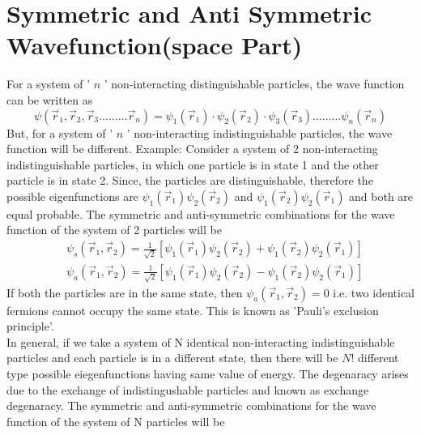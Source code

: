 \section{Symmetric and Anti Symmetric Wavefunction(space Part)}
For a system of ' $n$ ' non-interacting distinguishable particles, the wave function can be written as
$$
\psi\left(\vec{r}_{1}, \vec{r}_{2}, \vec{r}_{3} \ldots \ldots \ldots \vec{r}_{n}\right)=\psi_{1}\left(\vec{r}_{1}\right) \cdot \psi_{2}\left(\vec{r}_{2}\right) \cdot \psi_{3}\left(\vec{r}_{3}\right) \ldots \ldots \ldots \psi_{n}\left(\vec{r}_{n}\right)
$$
But, for a system of ' $n$ ' non-interacting indistinguishable particles, the wave function will be different.
Example:
Consider a system of 2 non-interacting indistinguishable particles, in which one particle is in state 1 and the other particle is in state 2. Since, the particles are distinguishable, therefore the possible eigenfunctions are $\psi_{1}\left(\vec{r}_{1}\right) \psi_{2}\left(\vec{r}_{2}\right)$ and $\psi_{1}\left(\vec{r}_{2}\right) \psi_{2}\left(\vec{r}_{1}\right)$ and both are equal probable. The symmetric and anti-symmetric combinations for the wave function of the system of 2 particles will be
$$
\begin{aligned}
&\psi_{s}\left(\vec{r}_{1}, \vec{r}_{2}\right)=\frac{1}{\sqrt{2}}\left[\psi_{1}\left(\vec{r}_{1}\right) \psi_{2}\left(\vec{r}_{2}\right)+\psi_{1}\left(\vec{r}_{2}\right) \psi_{2}\left(\vec{r}_{1}\right)\right] \\
&\psi_{a}\left(\vec{r}_{1}, \vec{r}_{2}\right)=\frac{1}{\sqrt{2}}\left[\psi_{1}\left(\vec{r}_{1}\right) \psi_{2}\left(\vec{r}_{2}\right)-\psi_{1}\left(\vec{r}_{2}\right) \psi_{2}\left(\vec{r}_{1}\right)\right]
\end{aligned}
$$
If both the particles are in the same state, then $\psi_{a}\left(\vec{r}_{1}, \vec{r}_{2}\right)=0$ i.e. two identical fermions cannot occupy the same state. This is known as 'Pauli's exclusion principle'.\\
In general, if we take a system of $\mathrm{N}$ identical non-interacting indistinguishable particles and each particle is in a different state, then there will be $N !$ different type possible eiegenfunctions having same value of energy. The degenaracy arises due to the exchange of indistingushable particles and known as exchange degenaracy. The symmetric and anti-symmetric combinations for the wave function of the system of $\mathrm{N}$ particles will be\\
